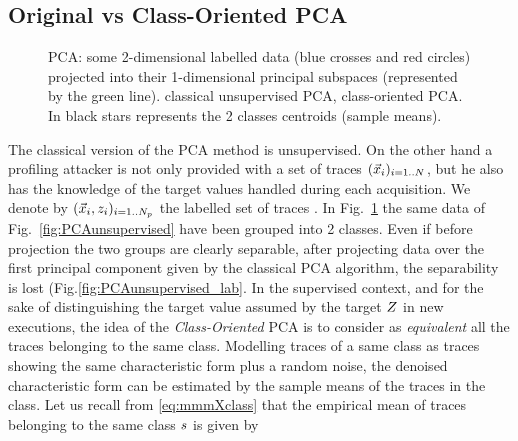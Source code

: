 \subsection{Original vs Class-Oriented PCA}
\begin{figure}[t]
\caption{PCA: some 2-dimensional labelled data (blue crosses and red circles) projected into their 1-dimensional principal subspaces (represented by the green line).  classical unsupervised PCA,  class-oriented PCA. In  black stars represents the 2 classes centroids (sample means).}\label{fig:2class-toys}
\end{figure}
The classical version of the PCA method is unsupervised.
On the other hand a profiling attacker is not only provided with a set of traces $(\vec{x}_i)_{i=1..N}$, but he also has the knowledge of the target values handled during each acquisition. We denote by $(\vec{x}_i, z_i)_{i=1..N_p}$ the labelled set of traces . In Fig.~\ref{fig:2class-toys} the same data of Fig.~\ref{fig:PCAunsupervised} have been grouped into 2 classes. Even if before projection the two groups are clearly separable, after projecting data over the first principal component given by the classical PCA algorithm, the separability is lost (Fig.\ref{fig:PCAunsupervised_lab}. In the supervised context, and for the sake of distinguishing the target value assumed by the target $Z$ in new executions, the idea of the {\em Class-Oriented} PCA is to consider as {\em equivalent} all the traces belonging to the same class. Modelling traces of a same class as traces showing the same characteristic form plus a random noise, the denoised characteristic form can be estimated by the sample means of the traces in the class. Let us recall from \eqref{eq:mmmXclass} that the empirical mean of traces belonging to the same class $s$ is given by
